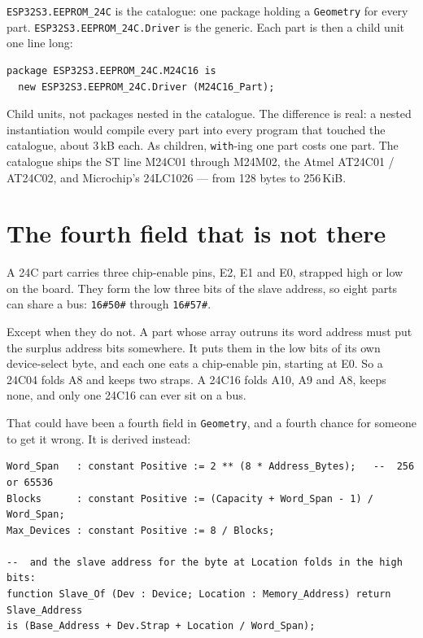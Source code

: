 \texttt{ESP32S3.EEPROM\_24C} is the catalogue: one package holding a
\texttt{Geometry} for every part. \texttt{ESP32S3.EEPROM\_24C.Driver} is the
generic. Each part is then a child unit one line long:

\begin{lstlisting}
package ESP32S3.EEPROM_24C.M24C16 is
  new ESP32S3.EEPROM_24C.Driver (M24C16_Part);
\end{lstlisting}

Child units, not packages nested in the catalogue. The difference is real: a
nested instantiation would compile every part into every program that touched the
catalogue, about 3\,kB each. As children, \texttt{with}-ing one part costs one
part. The catalogue ships the ST line M24C01 through M24M02, the Atmel AT24C01 /
AT24C02, and Microchip's 24LC1026 --- from 128 bytes to 256\,KiB.

\section{The fourth field that is not there}

A 24C part carries three chip-enable pins, E2, E1 and E0, strapped high or low on
the board. They form the low three bits of the slave address, so eight parts can
share a bus: \texttt{16\#50\#} through \texttt{16\#57\#}.

Except when they do not. A part whose array outruns its word address must put the
surplus address bits somewhere. It puts them in the low bits of its own
device-select byte, and each one eats a chip-enable pin, starting at E0. So a
24C04 folds A8 and keeps two straps. A 24C16 folds A10, A9 and A8, keeps none, and
only one 24C16 can ever sit on a bus.

That could have been a fourth field in \texttt{Geometry}, and a fourth chance for
someone to get it wrong. It is derived instead:

\begin{lstlisting}
Word_Span   : constant Positive := 2 ** (8 * Address_Bytes);   --  256 or 65536
Blocks      : constant Positive := (Capacity + Word_Span - 1) / Word_Span;
Max_Devices : constant Positive := 8 / Blocks;

--  and the slave address for the byte at Location folds in the high bits:
function Slave_Of (Dev : Device; Location : Memory_Address) return Slave_Address
is (Base_Address + Dev.Strap + Location / Word_Span);
\end{lstlisting}

